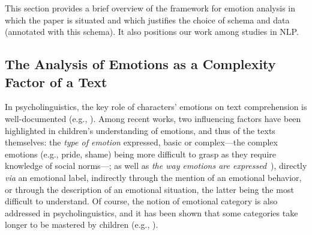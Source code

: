 %
This section provides a brief overview of the framework for emotion analysis in which the paper is situated and which justifies the choice of schema and data (annotated with this schema). It also positions our work among studies in NLP.

\subsection{The Analysis of Emotions as a Complexity Factor of a Text }\label{subsec:annotation}

In psycholinguistics, the key role of characters' emotions on text comprehension is well-documented (e.g., \citealp{dijkstra_character_1995,dyer_role_1983}). Among recent works, two influencing factors have been highlighted in children's understanding of emotions, and thus of the texts themselves: the \textit{type of emotion} expressed, basic or complex---the complex emotions (e.g., pride, shame) being more difficult to grasp as they require knowledge of social norms---\citep{davidson_role_2006,blanc_production_2017}; as well as \textit{the way emotions are expressed}~\citep{creissen-blanc2017}), directly \textit{via} an emotional label, indirectly through the mention of an emotional behavior, or through the description of an emotional situation, the latter being the most difficult to understand. Of course, the notion of emotional category is also addressed in psycholinguistics, and it has been shown that some categories take longer to be mastered by children (e.g., \citealp{baron-cohen_emotion_2010}).

